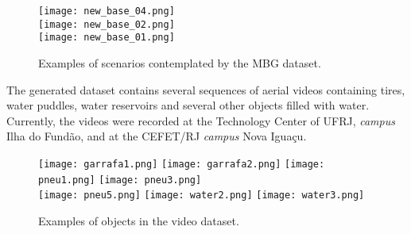 \begin{figure*}[htb!]
	\centering
	\texttt{[image: new\_base\_04.png]}\\
	\vspace{2mm}
	\texttt{[image: new\_base\_02.png]}\\
	\vspace{2mm}
	\texttt{[image: new\_base\_01.png]}
	\caption{Examples of scenarios contemplated by the MBG dataset.}
	\label{fig:scenarios1}
\end{figure*}



The generated dataset contains several sequences of aerial videos containing tires, water puddles, water reservoirs and several other objects filled with water.
Currently, the videos were recorded at the Technology Center of UFRJ, {\it campus} Ilha do Fundão, and at the CEFET/RJ {\it campus} Nova Iguaçu.
%
\begin{figure*}[htb!]
	\centering
	\texttt{[image: garrafa1.png]}
	\texttt{[image: garrafa2.png]}
	\texttt{[image: pneu1.png]}
	\texttt{[image: pneu3.png]}\\
	\vspace{2mm}
	\texttt{[image: pneu5.png]}
	\texttt{[image: water2.png]}
	\texttt{[image: water3.png]}
	\caption{Examples of objects in the video dataset.}
	\label{fig:objects1}
\end{figure*}

%
%
%
%

